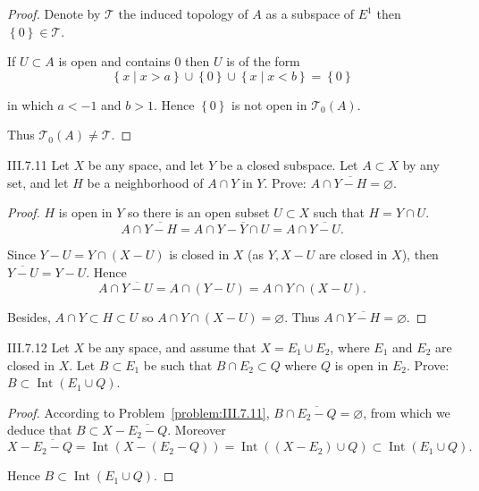 \begin{proof}
	Denote by \( \mathscr{T} \) the induced topology of \( A \) as a subspace of \( E^{1} \) then \( \left\{0\right\} \in \mathscr{T} \).

	If \( U \subset A \) is open and contains \( 0 \) then \( U \) is of the form
	\[
		\left\{ x \mid x > a \right\} \cup \left\{0\right\} \cup \left\{ x \mid x < b \right\} = \left\{0\right\}
	\]

	in which \( a < -1 \) and \( b > 1 \). Hence \( \left\{0\right\} \) is not open in \( \mathscr{T}_{0}(A) \).

	Thus \( \mathscr{T}_{0}(A) \ne \mathscr{T} \).
\end{proof}

\begin{problem}{III.7.11}\label{problem:III.7.11}
Let \(X\) be any space, and let \(Y\) be a closed subspace. Let \(A\subset X\) by any set, and let \(H\) be a neighborhood of \( A \cap Y \) in \(Y\). Prove: \( A \cap \overline{Y - H} = \varnothing \).
\end{problem}

\begin{proof}
	\( H \) is open in \( Y \) so there is an open subset \( U \subset X \) such that \( H = Y \cap U \).
	\[
		A \cap \overline{Y - H} = A \cap \overline{Y - Y \cap U} = A \cap \overline{Y - U}.
	\]

	Since \( Y - U = Y \cap (X - U) \) is closed in \(X\) (as \(Y, X - U\) are closed in \(X\)), then \( \overline{Y - U} = Y - U \). Hence
	\[
		A \cap \overline{Y - U} = A \cap (Y - U) = A \cap Y \cap (X - U).
	\]

	Besides, \( A \cap Y \subset H \subset U \) so \( A \cap Y \cap (X - U) = \varnothing \). Thus \( A \cap \overline{Y - H} = \varnothing \).
\end{proof}

\begin{problem}{III.7.12}
Let \(X\) be any space, and assume that \(X = E_{1} \cup E_{2}\), where \(E_{1}\) and \(E_{2}\) are closed in \(X\). Let \( B \subset E_{1} \) be such that \( B \cap E_{2} \subset Q \) where \( Q \) is open in \(E_{2}\). Prove: \(B \subset \operatorname{Int}(E_{1} \cup Q)\).
\end{problem}

\begin{proof}
	According to Problem~\ref{problem:III.7.11}, \( B \cap \overline{E_{2} - Q} = \varnothing \), from which we deduce that \( B \subset X - \overline{E_{2} - Q} \). Moreover
	\[
		X - \overline{E_{2} - Q} = \operatorname{Int}(X - (E_{2} - Q)) = \operatorname{Int}((X - E_{2}) \cup Q) \subset \operatorname{Int}(E_{1} \cup Q).
	\]

	Hence \( B \subset \operatorname{Int}(E_{1} \cup Q) \).
\end{proof}

